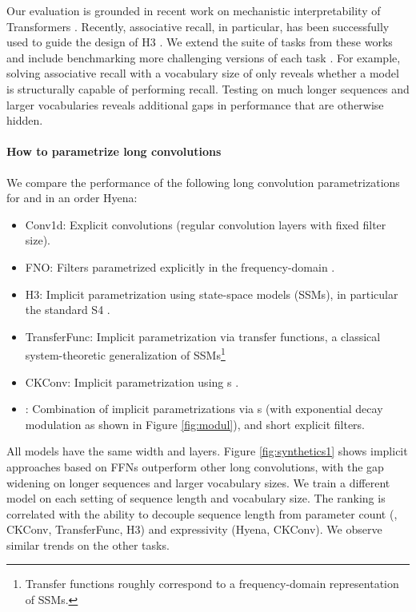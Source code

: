 Our evaluation is grounded in recent work on mechanistic interpretability of Transformers \citep{elhage2021mathematical,power2022grokking,olsson2022context,zhang2022unveiling}. Recently, associative recall, in particular, has been successfully used to guide the design of H3 \citep{dao2022hungry}. We extend the suite of tasks from these works and include benchmarking more challenging versions of each task . For example, solving associative recall with a vocabulary size of only  reveals whether a model is structurally capable of performing recall. Testing on much longer sequences and larger vocabularies reveals additional gaps in performance that are otherwise hidden.
\paragraph{How to parametrize long convolutions}
We compare the performance of the following long convolution parametrizations for  and  in an order  Hyena:
\begin{itemize}[leftmargin=0.1in]
    \item Conv1d: Explicit convolutions (regular convolution layers with fixed filter size).
    \item FNO: Filters parametrized explicitly in the frequency-domain \citep{li2020fourier}.
    \item H3: Implicit parametrization using state-space models (SSMs), in particular the standard S4 \citep{gu2021efficiently}. 
    \item TransferFunc: Implicit parametrization via transfer functions, a classical system-theoretic generalization of SSMs\footnote{Transfer functions roughly correspond to a frequency-domain representation of SSMs.} 
    \item CKConv: Implicit parametrization using {s} \citep{romero2021ckconv}. 
    \item : Combination of implicit parametrizations via {s} (with exponential decay modulation as shown in Figure \ref{fig:modul}), and short explicit filters.
\end{itemize}
All models have the same width and  layers. Figure \ref{fig:synthetics1} shows implicit approaches based on {\sf FFNs} outperform other long convolutions, with the gap widening on longer sequences and larger vocabulary sizes. We train a different model on each setting of sequence length and vocabulary size. The ranking is correlated with the ability to decouple sequence length from parameter count (, CKConv, TransferFunc, H3) and expressivity (Hyena, CKConv). We observe similar trends on the other tasks.

